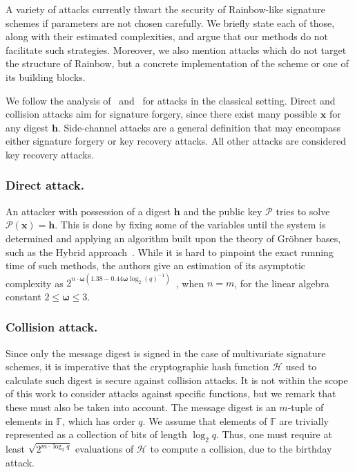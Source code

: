 \documentclass[12pt, a4paper, oneside]{memoir}
\theoremstyle{definition}
\begin{document}
A variety of attacks currently thwart the security of Rainbow-like signature schemes if parameters are not chosen carefully. We briefly state each of those, along with their estimated complexities, and argue that our methods do not facilitate such strategies. Moreover, we also mention attacks which do not target the structure of Rainbow, but a concrete implementation of the scheme or one of its building blocks. 

We follow the analysis of~\cite[Sec.~8]{Ding:201901} and~\cite{Petzoldt:201005} for attacks in the classical setting. Direct and collision attacks aim for signature forgery, since there exist many possible $\mathbf{x}$ for any digest $\mathbf{h}$. Side-channel attacks are a general definition that may encompass either signature forgery or key recovery attacks. All other attacks are considered key recovery attacks.

\subsubsection{Direct attack.} 

An attacker with possession of a digest $\mathbf{h}$ and the public key $\mathcal{P}$ tries to solve $\mathcal{P}(\mathbf{x}) = \mathbf{h}$. This is done by fixing some of the variables until the system is determined and applying an algorithm built upon the theory of Gröbner bases, such as the Hybrid approach~\cite{Bettale:201207}. While it is hard to pinpoint the exact running time of such methods, the authors give an estimation of its asymptotic complexity as $2^{n \cdot \bm{\omega} (1.38 - 0.44 \bm{\omega} \log_{2} (q)^{-1})}$~\cite[Thm.~3]{Bettale:201207}, when $n = m$, for the linear algebra constant $2 \leq \bm{\omega} \leq 3$.

\subsubsection{Collision attack.}

Since only the message digest is signed in the case of multivariate signature schemes, it is imperative that the cryptographic hash function $\mathcal{H}$ used to calculate such digest is secure against collision attacks. It is not within the scope of this work to consider attacks against specific functions, but we remark that these must also be taken into account. The message digest is an $m$-tuple of elements in $\mathbb{F}$, which has order $q$. We assume that elements of $\mathbb{F}$ are trivially represented as a collection of bits of length $\log_{2} q$. Thus, one must require at least $\sqrt{2^{m \cdot \log_{2} q}}$ evaluations of $\mathcal{H}$ to compute a collision, due to the birthday attack.
\end{document}
